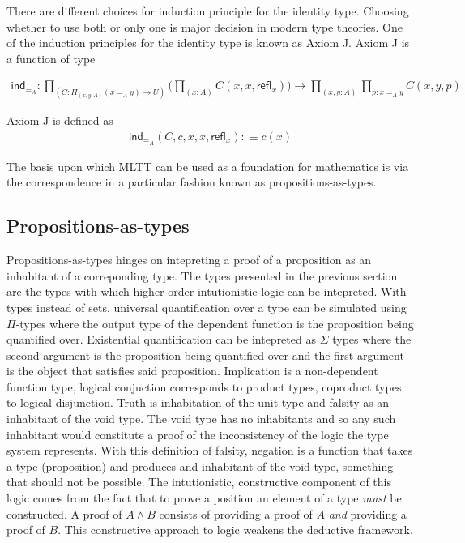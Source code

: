 There are different choices for induction principle for the identity type.
Choosing whether to use both or only one is major decision in modern type
theories. One of the induction principles for the identity type is known as
\textsf{Axiom J}. \textsf{Axiom J} is a function of type

\begin{align*}
    \textsf{ind}_{=_{A}} : \prod_{(C : \Pi_{(x,y : A)}(x=_{A}y)\rightarrow
    U)}\bigg(\prod_{(x : A)}C(x,x,\textsf{refl}_{x})\bigg) \rightarrow
    \prod_{(x,y:A)}\prod_{p:x=_{A}y}C(x,y,p)
\end{align*}

\textsf{Axiom J} is defined as
\begin{align*}
    \textsf{ind}_{=_{A}} (C,c,x,x,\textsf{refl}_{x}) :\equiv c(x)
\end{align*}


The basis upon which MLTT can be used as a foundation for mathematics is via the
\cuho{} correspondence in a particular fashion known as
propositions-as-types.

\subsection{Propositions-as-types}
Propositions-as-types hinges on intepreting a proof of a proposition as an
inhabitant of a correponding type. The types presented in the previous section
are the types with which higher order intutionistic logic can be intepreted.
With types instead of sets, universal quantification over a type can be
simulated using $\Pi$-types where the output type of the dependent function is
the proposition being quantified over. Existential quantification can be
intepreted as $\Sigma$ types where the second argument is the proposition being
quantified over and the first argument is the object that satisfies said
proposition. Implication is a non-dependent function type, logical conjuction
corresponds to product types, coproduct types to logical disjunction. Truth is
inhabitation of the unit type and falsity as an inhabitant of the void type. The
void type has no inhabitants and so any such inhabitant would constitute a proof
of the inconsistency of the logic the type system represents. With this
definition of falsity, negation is a function that takes a type (proposition)
and produces and inhabitant of the void type, something that should not be
possible. The intutionistic, constructive component of this logic comes from the
fact that to prove a position an element of a type \textit{must} be constructed.
A proof of $A \land B$ consists of providing a proof of $A$ \textit{and}
providing a proof of $B$. This constructive approach to logic weakens the
deductive framework.

